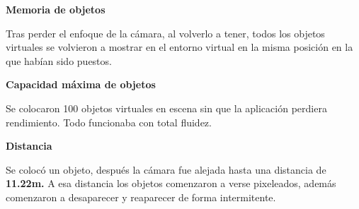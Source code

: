 
\textbf{Memoria de objetos} \par
Tras perder el enfoque de la cámara, al volverlo a tener, todos los objetos virtuales se volvieron a mostrar en el entorno virtual en la misma posición en la que habían sido puestos.

\textbf{Capacidad máxima de objetos} \par
Se colocaron 100 objetos virtuales en escena sin que la aplicación perdiera rendimiento. Todo funcionaba con total fluidez.


\textbf{Distancia} \par
Se colocó un objeto, después la cámara fue alejada hasta una distancia de \textbf{11.22m.} A esa distancia los objetos comenzaron a verse pixeleados, además comenzaron a desaparecer y reaparecer de forma intermitente.

